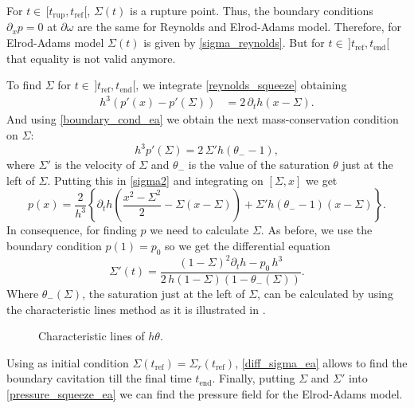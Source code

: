 For $t\in\,[t_\text{rup},t_\text{ref}[$, $\Sigma(t)$ is a rupture point. Thus, the boundary conditions $\partial_x p=0$ at $\partial \omega$ are the same for Reynolds and Elrod-Adams model. Therefore, for Elrod-Adams model $\Sigma(t)$ is given by \eqref{sigma_reynolds}. But for $t\in \,]t_\text{ref},t_\text{end}[$ that equality is not valid anymore.

To find $\Sigma$ for $t\in \,]t_\text{ref},t_\text{end}[$, we integrate \eqref{reynolds_squeeze} obtaining
\begin{align}
h^3\left(p'(x)-p'(\Sigma)\right)&=2\,\partial_t h\left(x-\Sigma\right).\label{eq:sigma2}
\end{align}
And using \eqref{boundary_cond_ea} we obtain the next mass-conservation condition on $\Sigma$:
\begin{equation}
h^3p'(\Sigma)=2\,\Sigma'h\left(\theta_--1\right),\label{eq:sigma3}
\end{equation}
where $\Sigma'$ is the velocity of $\Sigma$ and $\theta_-$ is the value of the saturation $\theta$ just at the left of $\Sigma$. Putting this in \eqref{sigma2} and integrating on $[\Sigma,x]$ we get
\begin{equation}
p(x)=\frac{2}{h^3}\left\{\partial_t h\left(\frac{x^2-\Sigma^2}{2}-\Sigma\left(x-\Sigma\right)\right)+\Sigma'h(\theta_--1)(x-\Sigma)\right\}.\label{eq:pressure_squeeze_ea}
\end{equation}
In consequence, for finding $p$ we need to calculate $\Sigma$. As before, we use the boundary condition $p(1)=p_0$ so we get the differential equation
\begin{equation}
\Sigma'(t)=\frac{\left(1-\Sigma\right)^2\partial_t h-p_0\, h^3}{2\,h\left(1-\Sigma\right)\left(1-\theta_-(\Sigma)\right)}.\label{eq:diff_sigma_ea}
\end{equation}
Where $\theta_-(\Sigma)$, the saturation just at the left of $\Sigma$, can be calculated by using the characteristic lines method as it is illustrated in .
\begin{figure}[ht]
\centering 
\def\svgwidth{\textwidth}\small{
}\caption[Characteristic lines for Pure Squeeze Motion]{Characteristic lines of $h\theta$.}\label{fig:sol_squeeze_ea}
\end{figure}

Using as initial condition $\Sigma(t_\text{ref})=\Sigma_r(t_\text{ref})$, \eqref{diff_sigma_ea} allows to find the boundary cavitation till the final time $t_\text{end}$. Finally, putting $\Sigma$ and $\Sigma'$ into \eqref{pressure_squeeze_ea} we can find the pressure field for the Elrod-Adams model.
